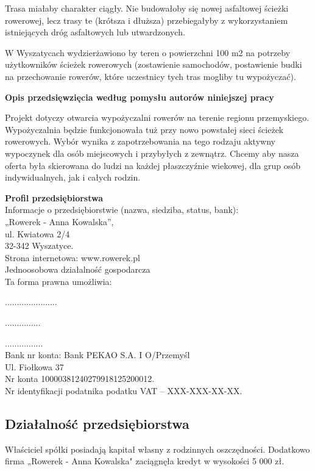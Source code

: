 \documentclass{sprawozdanie-agh}
\begin{document}
		Trasa miałaby charakter ciągły. Nie budowałoby się nowej asfaltowej ścieżki rowerowej, lecz trasy te (krótsza i dłuższa) przebiegałyby z wykorzystaniem istniejących dróg asfaltowych lub utwardzonych.
	
		W Wyszatycach wydzierżawiono by teren o powierzchni 100 m2 na potrzeby użytkowników ścieżek rowerowych (zostawienie samochodów, postawienie budki na przechowanie  rowerów, które uczestnicy tych tras mogliby tu wypożyczać).
	
		\textbf{Opis przedsięwzięcia według  pomysłu autorów niniejszej pracy}
		
		Projekt dotyczy otwarcia wypożyczalni rowerów na terenie regionu przemyskiego. Wypożyczalnia będzie funkcjonowała tuż przy nowo powstałej sieci ścieżek rowerowych. Wybór wynika z zapotrzebowania na tego rodzaju aktywny wypoczynek dla osób miejscowych i przybyłych z zewnątrz. Chcemy aby nasza oferta była skierowana do ludzi na każdej płaszczyźnie wiekowej, dla grup osób indywidualnych, jak i całych rodzin.
		
		\textbf{Profil przedsiębiorstwa}\\
		Informacje o przedsiębiorstwie (nazwa, siedziba, status, bank):\\
		„Rowerek - Anna Kowalska”,\\
		ul. Kwiatowa 2/4\\
		32-342 Wyszatyce.\\
		Strona internetowa: www.rowerek.pl\\
		Jednoosobowa działalność gospodarcza\\
		Ta forma prawna umożliwia:
		
		......................
		
		...............
		
		................\\
		Bank nr konta: Bank PEKAO S.A. 	I O/Przemyśl\\
		Ul. Fiołkowa 37\\
		Nr konta 10000381240279918125200012.\\
		Nr identyfikacji podatnika podatku VAT – XXX-XXX-XX-XX.
		
		\subsection{Działalność przedsiębiorstwa}

		Właściciel spółki posiadają kapitał własny z rodzinnych oszczędności.
		Dodatkowo firma „Rowerek - Anna Kowalska" zaciągnęła kredyt w wysokości 5 000 zł. 
		
\end{document}

